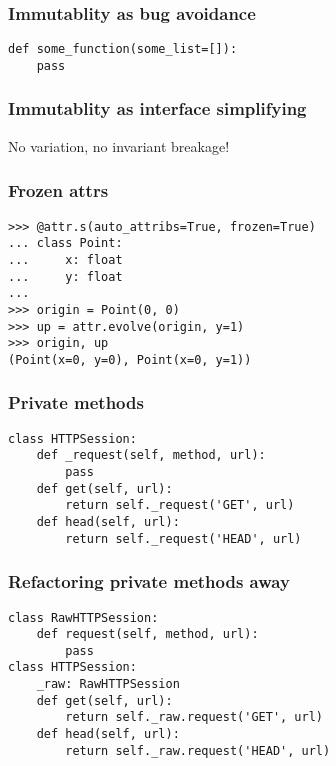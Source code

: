 \begin{frame}[fragile]
\frametitle{Immutablity as bug avoidance}

\begin{lstlisting}
def some_function(some_list=[]):
    pass
\end{lstlisting}

\end{frame}

\begin{frame}[fragile]
\frametitle{Immutablity as interface simplifying}

No variation, no invariant breakage!
\end{frame}

\begin{frame}[fragile]
\frametitle{Frozen attrs}

\begin{lstlisting}
>>> @attr.s(auto_attribs=True, frozen=True)
... class Point:
...     x: float
...     y: float
... 
>>> origin = Point(0, 0)
>>> up = attr.evolve(origin, y=1)
>>> origin, up
(Point(x=0, y=0), Point(x=0, y=1))
\end{lstlisting}

\end{frame}

\begin{frame}[fragile]
\frametitle{Private methods}

\begin{lstlisting}
class HTTPSession:
    def _request(self, method, url):
        pass
    def get(self, url):
        return self._request('GET', url)
    def head(self, url):
        return self._request('HEAD', url)
\end{lstlisting}
    
\end{frame}

\begin{frame}[fragile]
\frametitle{Refactoring private methods away}

\begin{lstlisting}
class RawHTTPSession:
    def request(self, method, url):
        pass
class HTTPSession:
    _raw: RawHTTPSession
    def get(self, url):
        return self._raw.request('GET', url)
    def head(self, url):
        return self._raw.request('HEAD', url)
\end{lstlisting}
    
\end{frame}

